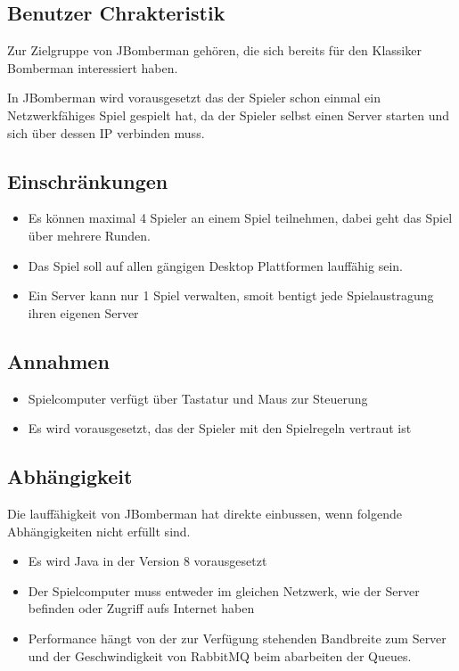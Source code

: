 \documentclass[11pt]{scrartcl}
\begin{document}
\subsection{Benutzer Chrakteristik}
\label{sec:Benutzer Chrakteristik}
Zur Zielgruppe von JBomberman gehören, die sich bereits für den Klassiker Bomberman interessiert haben.

In JBomberman wird vorausgesetzt das der Spieler schon einmal ein Netzwerkfähiges Spiel gespielt hat, da der Spieler selbst einen Server starten und sich über dessen IP verbinden muss.
\subsection{Einschränkungen}
\label{sec:Einschränkungen}
\begin{itemize}
    \item Es können maximal 4 Spieler an einem Spiel teilnehmen, dabei geht das Spiel über mehrere Runden.
    \item Das Spiel soll auf allen gängigen Desktop Plattformen lauffähig sein.
    \item Ein Server kann nur 1 Spiel verwalten, smoit bentigt jede Spielaustragung ihren eigenen Server
\end{itemize}
\subsection{Annahmen}
\label{sec:Annahmen}
\begin{itemize}
    \item Spielcomputer verfügt über Tastatur und Maus zur Steuerung
    \item Es wird vorausgesetzt, das der Spieler mit den Spielregeln vertraut ist
\end{itemize}

\subsection{Abhängigkeit}
\label{sec:Abhängigkeit}
Die lauffähigkeit von JBomberman hat direkte einbussen, wenn folgende Abhängigkeiten nicht erfüllt sind.
\begin{itemize}
    \item Es wird Java in der Version 8 vorausgesetzt
    \item Der Spielcomputer muss entweder im gleichen Netzwerk, wie der Server befinden oder Zugriff aufs Internet haben
    \item Performance hängt von der zur Verfügung stehenden Bandbreite zum Server und der Geschwindigkeit von RabbitMQ beim abarbeiten der Queues.
\end{itemize}
\end{document}
